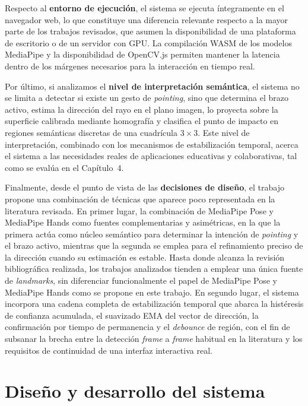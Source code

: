\documentclass[12pt]{report} %
\begin{document}
Respecto al \textbf{entorno de ejecución}, el sistema se ejecuta íntegramente en el navegador web, lo que constituye una diferencia relevante respecto a la mayor parte de los trabajos revisados, que asumen la disponibilidad de una plataforma de escritorio o de un servidor con GPU. La compilación WASM de los modelos MediaPipe y la disponibilidad de OpenCV.js permiten mantener la latencia dentro de los márgenes necesarios para la interacción en tiempo real.

Por último, si analizamos el \textbf{nivel de interpretación semántica}, el sistema no se limita a detectar si existe un gesto de \textit{pointing}, sino que determina el brazo activo, estima la dirección del rayo en el plano imagen, lo proyecta sobre la superficie calibrada mediante homografía y clasifica el punto de impacto en regiones semánticas discretas de una cuadrícula $3 \times 3$. Este nivel de interpretación, combinado con los mecanismos de estabilización temporal, acerca el sistema a las necesidades reales de aplicaciones educativas y colaborativas, tal como se evalúa en el Capítulo~4.

Finalmente, desde el punto de vista de las \textbf{decisiones de diseño}, el trabajo propone una combinación de técnicas que aparece poco representada en la literatura revisada. En primer lugar, la combinación de MediaPipe Pose y MediaPipe Hands como fuentes complementarias y asimétricas, en la que la primera actúa como núcleo semántico para determinar la intención de \textit{pointing} y el brazo activo, mientras que la segunda se emplea para el refinamiento preciso de la dirección cuando su estimación es estable. Hasta donde alcanza la revisión bibliográfica realizada, los trabajos analizados tienden a emplear una única fuente de \textit{landmarks}, sin diferenciar funcionalmente el papel de MediaPipe Pose y MediaPipe Hands como se propone en este trabajo. En segundo lugar, el sistema incorpora una cadena completa de estabilización temporal que abarca la histéresis de confianza acumulada, el suavizado EMA del vector de dirección, la confirmación por tiempo de permanencia y el \textit{debounce} de región, con el fin de subsanar la brecha entre la detección \textit{frame} a \textit{frame} habitual en la literatura y los requisitos de continuidad de una interfaz interactiva real.


\chapter{Diseño y desarrollo del sistema}
\end{document}
